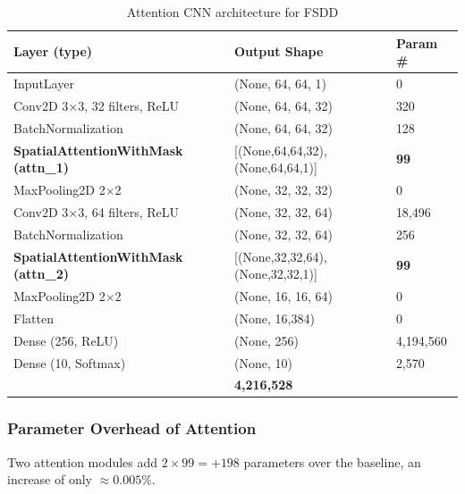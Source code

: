 \documentclass[12pt,a4paper]{article}
\begin{document}
\begin{table}[H]
\centering
\caption{Attention CNN architecture for FSDD}
\label{tab:b_attention_arch}
\begin{tabular}{L{5.5cm} C{3.8cm} C{2cm}}
\toprule
{}
\textbf{Layer (type)} & \textbf{Output Shape} & \textbf{Param \#} \\
\midrule
InputLayer                                       & (None, 64, 64, 1)  & 0 \\
Conv2D 3$\times$3, 32 filters, ReLU             & (None, 64, 64, 32) & 320 \\
BatchNormalization                               & (None, 64, 64, 32) & 128 \\
\textbf{SpatialAttentionWithMask (attn\_1)}      & [(None,64,64,32), (None,64,64,1)] & \textbf{99} \\
MaxPooling2D 2$\times$2                          & (None, 32, 32, 32) & 0 \\
Conv2D 3$\times$3, 64 filters, ReLU             & (None, 32, 32, 64) & 18,496 \\
BatchNormalization                               & (None, 32, 32, 64) & 256 \\
\textbf{SpatialAttentionWithMask (attn\_2)}      & [(None,32,32,64), (None,32,32,1)] & \textbf{99} \\
MaxPooling2D 2$\times$2                          & (None, 16, 16, 64) & 0 \\
Flatten                                          & (None, 16,384)      & 0 \\
Dense (256, ReLU)                                & (None, 256)         & 4,194,560 \\
Dense (10, Softmax)                              & (None, 10)          & 2,570 \\
\midrule
{}
 & \textbf{4,216,528} \\
\bottomrule
\end{tabular}
\end{table}

\subsubsection{Parameter Overhead of Attention}

Two attention modules add $2\times99=+198$ parameters over the baseline, an
increase of only $\approx 0.005\%$.
\end{document}
